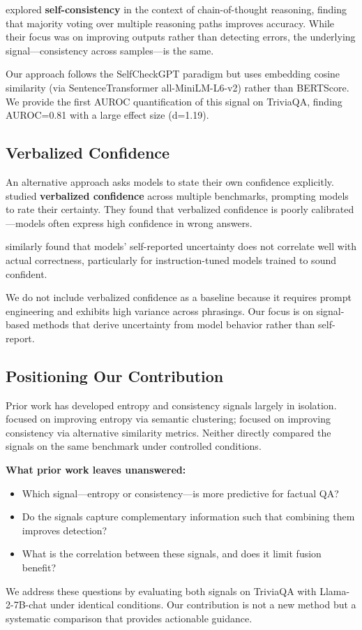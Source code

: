 \citet{wang2023selfconsistency} explored \textbf{self-consistency} in the context of chain-of-thought reasoning, finding that majority voting over multiple reasoning paths improves accuracy. While their focus was on improving outputs rather than detecting errors, the underlying signal---consistency across samples---is the same.

Our approach follows the SelfCheckGPT paradigm but uses embedding cosine similarity (via SentenceTransformer all-MiniLM-L6-v2) rather than BERTScore. We provide the first AUROC quantification of this signal on TriviaQA, finding AUROC=0.81 with a large effect size (d=1.19).

\subsection{Verbalized Confidence}

An alternative approach asks models to state their own confidence explicitly. \citet{xiong2023can} studied \textbf{verbalized confidence} across multiple benchmarks, prompting models to rate their certainty. They found that verbalized confidence is poorly calibrated---models often express high confidence in wrong answers.

\citet{lin2022teaching} similarly found that models' self-reported uncertainty does not correlate well with actual correctness, particularly for instruction-tuned models trained to sound confident.

We do not include verbalized confidence as a baseline because it requires prompt engineering and exhibits high variance across phrasings. Our focus is on signal-based methods that derive uncertainty from model behavior rather than self-report.

\subsection{Positioning Our Contribution}

Prior work has developed entropy and consistency signals largely in isolation. \citet{kuhn2023semantic} focused on improving entropy via semantic clustering; \citet{manakul2023selfcheckgpt} focused on improving consistency via alternative similarity metrics. Neither directly compared the signals on the same benchmark under controlled conditions.

\textbf{What prior work leaves unanswered:}
\begin{itemize}
    \item Which signal---entropy or consistency---is more predictive for factual QA?
    \item Do the signals capture complementary information such that combining them improves detection?
    \item What is the correlation between these signals, and does it limit fusion benefit?
\end{itemize}

We address these questions by evaluating both signals on TriviaQA with Llama-2-7B-chat under identical conditions. Our contribution is not a new method but a systematic comparison that provides actionable guidance.
